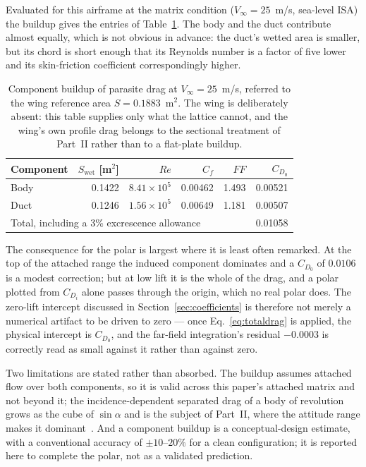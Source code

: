 \documentclass[submit]{aiaa-tc}%
\begin{document}
Evaluated for this airframe at the matrix condition
($V_\infty = 25$~m/s, sea-level ISA) the buildup gives the entries of
Table~\ref{tab:parasite}. The body and the duct contribute almost
equally, which is not obvious in advance: the duct's wetted area is
smaller, but its chord is short enough that its Reynolds number is a
factor of five lower and its skin-friction coefficient correspondingly
higher.

\begin{table}[tb]
  \centering
  \caption{Component buildup of parasite drag at $V_\infty = 25$~m/s,
    referred to the wing reference area $S = 0.1883$~m$^2$. The wing is
    deliberately absent: this table supplies only what the lattice cannot,
    and the wing's own profile drag belongs to the sectional treatment of
    Part~II rather than to a flat-plate buildup.}
  \label{tab:parasite}
  \begin{tabular}{lrrrrr}
    \hline
    Component & $S_{\mathrm{wet}}$ [m$^2$] & $Re$ & $C_f$ & $FF$ &
      $C_{D_0}$ \\
    \hline
    Body & 0.1422 & $8.41 \times 10^5$ & 0.00462 & 1.493 & 0.00521 \\
    Duct & 0.1246 & $1.56 \times 10^5$ & 0.00649 & 1.181 & 0.00507 \\
    \hline
    \multicolumn{5}{l}{Total, including a 3\% excrescence allowance} &
      0.01058 \\
    \hline
  \end{tabular}
\end{table}

The consequence for the polar is largest where it is least often
remarked. At the top of the attached range the induced component
dominates and a $C_{D_0}$ of $0.0106$ is a modest correction; but at low
lift it is the whole of the drag, and a polar plotted from $C_{D_i}$
alone passes through the origin, which no real polar does. The
zero-lift intercept discussed in Section~\ref{sec:coefficients} is
therefore not merely a numerical artifact to be driven to zero --- once
Eq.~\eqref{eq:totaldrag} is applied, the physical intercept is
$C_{D_0}$, and the far-field integration's residual $-0.0003$ is
correctly read as small against it rather than against zero.

Two limitations are stated rather than absorbed. The buildup assumes
attached flow over both components, so it is valid across this paper's
attached matrix and not beyond it; the incidence-dependent separated
drag of a body of revolution grows as the cube of $\sin\alpha$ and is the
subject of Part~II, where the attitude range makes it
dominant~\cite{allenPerkins1951,jorgensen1977}. And a component buildup
is a conceptual-design estimate, with a conventional accuracy of
$\pm 10$--$20\%$ for a clean configuration; it is reported here to
complete the polar, not as a validated prediction.
\end{document}
